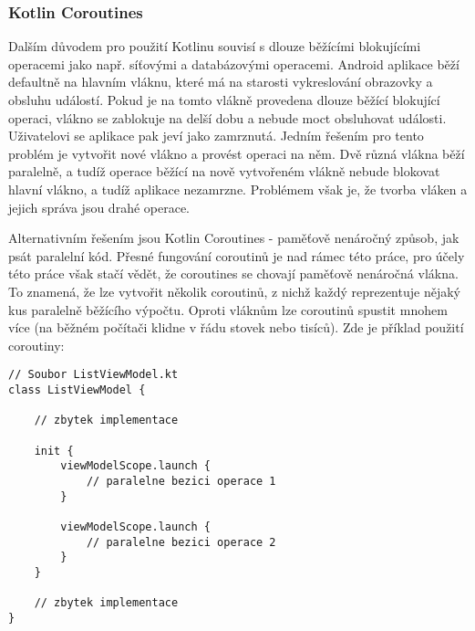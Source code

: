 \subsubsection*{Kotlin Coroutines}

\noindent Dalším důvodem pro použití Kotlinu souvisí s dlouze běžícími blokujícími operacemi jako např. síťovými a databázovými operacemi. Android aplikace běží defaultně na hlavním vláknu, které má na starosti vykreslování obrazovky a obsluhu událostí. Pokud je na tomto vlákně provedena dlouze běžící blokující operaci, vlákno se zablokuje na delší dobu a nebude moct obsluhovat události. Uživatelovi se aplikace pak jeví jako zamrznutá. Jedním řešením pro tento problém je vytvořit nové vlákno a provést operaci na něm. Dvě různá vlákna běží paralelně, a tudíž operace běžící na nově vytvořeném vlákně nebude blokovat hlavní vlákno, a tudíž aplikace nezamrzne. Problémem však je, že tvorba vláken a jejich správa jsou drahé operace. 

Alternativním řešením jsou Kotlin Coroutines - paměťově nenáročný způsob, jak psát paralelní kód. Přesné fungování coroutinů je nad rámec této práce, pro účely této práce však stačí vědět, že coroutines se chovají paměťově nenáročná vlákna. To znamená, že lze vytvořit několik coroutinů, z nichž každý reprezentuje nějaký kus paralelně běžícího výpočtu. Oproti vláknům lze coroutinů spustit mnohem více (na běžném počítači klidne v řádu stovek nebo tisíců). Zde je příklad použití coroutiny:

\begin{lstlisting}[caption={Příklad použití coroutiny}, label={lst:coroutine-example}, tabsize=2]
// Soubor ListViewModel.kt
class ListViewModel {

	// zbytek implementace

	init {
		viewModelScope.launch {
			// paralelne bezici operace 1
		}
		
		viewModelScope.launch {
			// paralelne bezici operace 2
		}
	}

	// zbytek implementace
}
\end{lstlisting}

